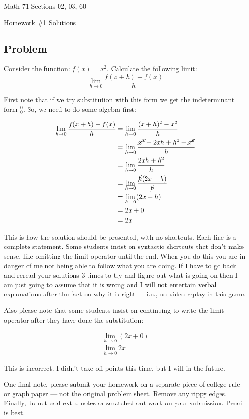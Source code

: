 \documentclass[letterpaper,12pt,fleqn]{article}
\begin{document}
\begin{center}
  \large
  Math-71 Sections 02, 03, 60

  \Large
  Homework \#1 Solutions
\end{center}

\subsection*{Problem}

Consider the function: \(f(x)=x^2\).  Calculate the following limit:
\[\lim_{h\to0}\frac{f(x+h)-f(x)}{h}\]

First note that if we try substitution with this form we get the indeterminant form \(\frac{0}{0}\).  So, we need
to do some algebra first:

\begin{align*}
  \lim_{h\to0}\frac{f(x+h)-f(x)}{h} &= \lim_{h\to0}\frac{(x+h)^2-x^2}{h} \\
  &= \lim_{h\to0}\frac{\cancel{x^2}+2xh+h^2-\cancel{x^2}}{h} \\
  &= \lim_{h\to0}\frac{2xh+h^2}{h} \\
  &= \lim_{h\to0}\frac{\cancel{h}(2x+h)}{\cancel{h}} \\
  &= \lim_{h\to0}(2x+h) \\
  &= 2x+0 \\
  &= 2x
\end{align*}

This is how the solution should be presented, with no shortcuts.  Each line is a complete statement.  Some students
insist on syntactic shortcuts that don't make sense, like omitting the limit operator until the end.  When you do
this you are in danger of me not being able to follow what you are doing.  If I have to go back and reread your
solutions 3 times to try and figure out what is going on then I am just going to assume that it is wrong and I will
not entertain verbal explanations after the fact on why it is right --- i.e., no video replay in this game.

Also please note that some students insist on continuing to write the limit operator after they have done the
substitution:

\begin{gather*}
  \lim_{h\to0}(2x+0) \\
  \lim_{h\to0}2x
\end{gather*}

This is incorrect.  I didn't take off points this time, but I will in the future.

One final note, please submit your homework on a separate piece of college rule or graph paper --- not the original
problem sheet.  Remove any rippy edges.  Finally, do not add extra notes or scratched out work on your submission.
Pencil is best.
\end{document}
